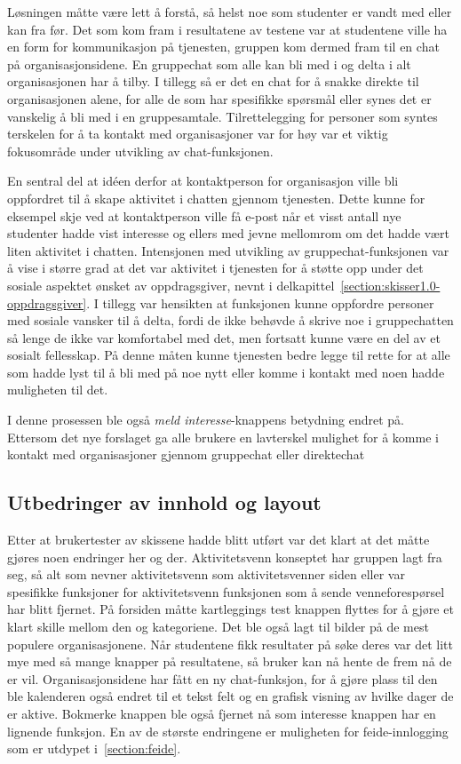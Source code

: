 Løsningen måtte være lett å forstå, så helst noe som studenter er vandt med eller kan fra før. Det som kom fram i resultatene av testene var at studentene ville ha en form for kommunikasjon på tjenesten, gruppen kom dermed fram til en chat på organisasjonsidene. En gruppechat som alle kan bli med i og delta i alt organisasjonen har å tilby. I tillegg så er det en chat for å snakke direkte til organisasjonen alene, for alle de som har spesifikke spørsmål eller synes det er vanskelig å bli med i en gruppesamtale. Tilrettelegging for personer som syntes terskelen for å ta kontakt med organisasjoner var for høy var et viktig fokusområde under utvikling av chat-funksjonen. 

En sentral del at idéen derfor at kontaktperson for organisasjon ville bli oppfordret til å skape aktivitet i chatten gjennom tjenesten. Dette kunne for eksempel skje ved at kontaktperson ville få e-post når et visst antall nye studenter hadde vist interesse og ellers med jevne mellomrom om det hadde vært liten aktivitet i chatten. Intensjonen med utvikling av gruppechat-funksjonen var å vise i større grad at det var aktivitet i tjenesten for å støtte opp under det sosiale aspektet ønsket av oppdragsgiver, nevnt i delkapittel~\ref{section:skisser1.0-oppdragsgiver}. I tillegg var hensikten at funksjonen kunne oppfordre personer med sosiale vansker til å delta, fordi de ikke behøvde å skrive noe i gruppechatten så lenge de ikke var komfortabel med det, men fortsatt kunne være en del av et sosialt fellesskap. På denne måten kunne tjenesten bedre legge til rette for at alle som hadde lyst til å bli med på noe nytt eller komme i kontakt med noen hadde muligheten til det.

I denne prosessen ble også {\em  meld interesse}-knappens betydning endret på. Ettersom det nye forslaget ga alle brukere en lavterskel mulighet for å komme i kontakt med organisasjoner gjennom gruppechat eller direktechat

\subsection{Utbedringer av innhold og layout}

Etter at brukertester av skissene hadde blitt utført var det klart at det måtte gjøres noen endringer her og der. Aktivitetsvenn konseptet har gruppen lagt fra seg, så alt som nevner aktivitetsvenn som aktivitetsvenner siden eller var spesifikke funksjoner for aktivitetsvenn funksjonen som å sende venneforespørsel har blitt fjernet. På forsiden måtte kartleggings test knappen flyttes for å gjøre et klart skille mellom den og kategoriene. Det ble også lagt til bilder på de mest populere organisasjonene. Når studentene fikk resultater på søke deres var det litt mye med så mange knapper på resultatene, så bruker kan nå hente de frem nå de er vil. Organisasjonsidene har fått en ny chat-funksjon, for å gjøre plass til den ble kalenderen også endret til et tekst felt og en grafisk visning av hvilke dager de er aktive. Bokmerke knappen ble også fjernet nå som interesse knappen har en lignende funksjon. En av de største endringene er muligheten for feide-innlogging som er utdypet i~\ref{section:feide}. 


